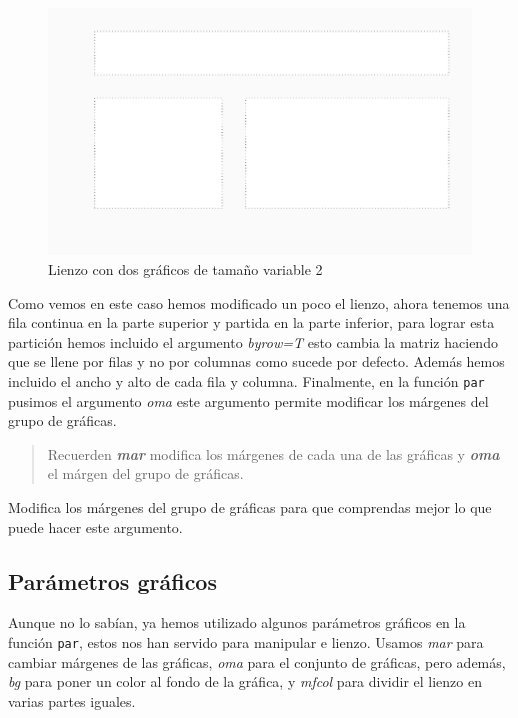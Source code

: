 \documentclass[]{article}
\begin{document}
\begin{figure}

{\centering \includegraphics{index_files/figure-latex/unnamed-chunk-6-1} 

}

\caption{Lienzo con dos gráficos de tamaño variable 2}\label{fig:unnamed-chunk-6}
\end{figure}

Como vemos en este caso hemos modificado un poco el lienzo, ahora
tenemos una fila continua en la parte superior y partida en la parte
inferior, para lograr esta partición hemos incluido el argumento
\emph{byrow=T} esto cambia la matriz haciendo que se llene por filas y
no por columnas como sucede por defecto. Además hemos incluido el ancho
y alto de cada fila y columna. Finalmente, en la función \texttt{par}
pusimos el argumento \emph{oma} este argumento permite modificar los
márgenes del grupo de gráficas.

\begin{quote}
Recuerden \textbf{\emph{mar}} modifica los márgenes de cada una de las
gráficas y \textbf{\emph{oma}} el márgen del grupo de gráficas.
\end{quote}

Modifica los márgenes del grupo de gráficas para que comprendas mejor lo
que puede hacer este argumento.

\subsection{Parámetros gráficos}\label{parametros-graficos}

Aunque no lo sabían, ya hemos utilizado algunos parámetros gráficos en
la función \texttt{par}, estos nos han servido para manipular e lienzo.
Usamos \emph{mar} para cambiar márgenes de las gráficas, \emph{oma} para
el conjunto de gráficas, pero además, \emph{bg} para poner un color al
fondo de la gráfica, y \emph{mfcol} para dividir el lienzo en varias
partes iguales.
\end{document}
